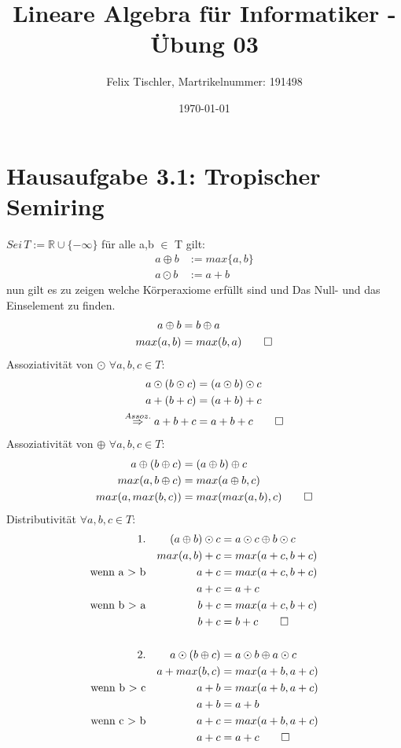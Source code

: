\documentclass[titlepage]{article}
\begin{document}
	
	\title{Lineare Algebra für Informatiker - Übung 03}
	\author{Felix Tischler, Martrikelnummer: 191498}
	\date{\today}
	\maketitle
	
	\section*{Hausaufgabe 3.1: Tropischer Semiring}
		$Sei\,T := \mathbb{R} \cup \{-\infty\}$ für alle a,b $\in$ T gilt:
		\begin{align*}
			a \oplus b &:= max\{a,b\}\\
			a \odot b &:= a + b
		\end{align*}
	nun gilt es zu zeigen welche Körperaxiome erfüllt sind und Das Null- und das Einselement zu finden.\\
	\begin{align*}
		a\oplus b &= b\oplus a\\
		max(a,b) &= max(b,a) \qed
	\end{align*}
	Assoziativität von $\odot$ $\forall a,b,c\in T$:
	\begin{align*}
		a \odot (b\odot c) &= (a\odot b)\odot c \\
		a+(b+c) &= (a+b)+c\\
		\overset{Assoz.}{\Rightarrow} a+b+c &= a+b+c \qed
	\end{align*}
	Assoziativität von $\oplus$ $\forall a,b,c\in T$:
	\begin{align*}
		a \oplus (b\oplus c) &= (a\oplus b)\oplus c \\
		max(a,b\oplus c) &= max(a\oplus b,c)\\
		max(a,max(b,c)) &= max(max(a,b),c) \qed\\
	\end{align*}
	Distributivität $\forall a,b,c\in T$:
	\begin{align*}
		1.&& (a\oplus b)\odot c &= a\odot c\oplus b\odot c\\
		&& max(a,b)+c &= max(a+c,b+c)\\
		\text{wenn a $>$ b}&& a+c &= max(a+c,b+c)\\
		&& a+c &= a+c\\
		\text{wenn b $>$ a}&& b+c &= max(a+c,b+c)\\
		&& b+c &= b+c \qed\\
		\\
		2.&& a\odot (b\oplus c) &= a\odot b\oplus a\odot c\\
		&& a+max(b,c) &= max(a+b,a+c)\\
		\text{wenn b $>$ c}&& a+b &= max(a+b,a+c)\\
		&& a+b &= a+b\\
		\text{wenn c $>$ b}&& a+c &= max(a+b,a+c)\\
		&& a+c &= a+c \qed
	\end{align*}
\end{document}
